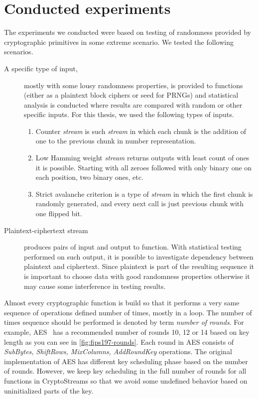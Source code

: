 \documentclass[
    digital,    %
    oneside,    %
    color,
    11pt,
    nocover,
    notable,
    nolof,
    nolot,
    final
]{fithesis3}
\renewcommand\_{\textunderscore\allowbreak}
\begin{document}
\section{Conducted experiments}
\label{sec:conducted-experiments}

The experiments we conducted were based on testing of randomness provided by cryptographic primitives in some extreme scenario. We tested the following scenarios.

\begin{description}
	\item[A specific type of input,] mostly with some lousy randomness properties, is provided to functions (either as a plaintext block ciphers or seed for PRNGs) and statistical analysis is conducted where results are compared with random or other specific inputs. For this thesis, we used the following types of inputs.
	\begin{enumerate}
		\item Counter \textit{stream} is such \textit{stream} in which each chunk is the addition of one to the previous chunk in number representation.
		\item Low Hamming weight \textit{stream} returns outputs with least count of ones it is possible. Starting with all zeroes followed with only binary one on each position, two binary ones, etc.
		\item Strict avalanche criterion is a type of \textit{stream} in which the first chunk is randomly generated, and every next call is just previous chunk with one flipped bit.
	\end{enumerate}
	
	\item[Plaintext-ciphertext stream] produces pairs of input and output to function. With statistical testing performed on such output, it is possible to investigate dependency between plaintext and ciphertext. Since plaintext is part of the resulting sequence it is important to choose data with good randomness properties otherwise it may cause some interference in testing results.
\end{description}

Almost every cryptographic function is build so that it performs a very same sequence of operations defined number of times, mostly in a loop. The number of times sequence should be performed is denoted by term \textit{number of rounds}. For example, AES~\cite{FIPS-197} has a recommended number of rounds 10, 12 or 14 based on key length as you can see in \cref{fig:fips197-rounds}. Each round in AES consists of \textit{SubBytes, ShiftRows, MixColumns, AddRoundKey} operations. The original implementation of AES has different key scheduling phase based on the number of rounds. However, we keep key scheduling in the full number of rounds for all functions in CryptoStreams so that we avoid some undefined behavior based on uninitialized parts of the key.
\end{document}
